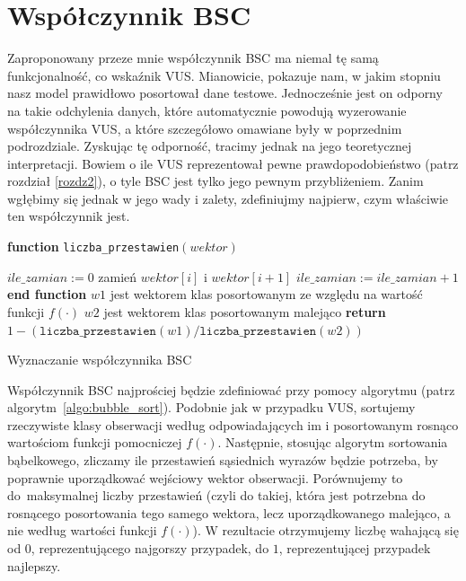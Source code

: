 \documentclass{mini}
\newlength\myindent
\newcommand\bindent{%
  \begingroup
  \setlength{\itemindent}{\myindent}
  \addtolength{\algorithmicindent}{\myindent}
}
\newcommand\eindent{\endgroup}
\begin{document}
\section{Współczynnik BSC}

Zaproponowany przeze mnie współczynnik BSC ma niemal tę samą funkcjonalność, co wskaźnik VUS. Mianowicie, pokazuje nam, w jakim stopniu nasz model prawidłowo posortował dane testowe. Jednocześnie jest on odporny na takie odchylenia danych, które automatycznie powodują wyzerowanie współczynnika VUS, a które szczegółowo omawiane były w poprzednim podrozdziale. Zyskując tę odporność, tracimy jednak na jego teoretycznej interpretacji. Bowiem o ile VUS reprezentował pewne prawdopodobieństwo (patrz rozdział \ref{rozdz2}), o tyle BSC jest tylko jego pewnym przybliżeniem. Zanim wgłębimy się jednak w jego wady i zalety, zdefiniujmy najpierw, czym właściwie ten współczynnik jest.  

\begin{algorithm}
\begin{algorithmic}
\STATE
\STATE \textbf{function} \texttt{liczba\_przestawien}$(wektor)$
\bindent
\STATE $ile\_zamian := 0$ 
            \STATE zamień $wektor[i]$ i $wektor[i+1]$
            \STATE $ile\_zamian := ile\_zamian+1$
        \ENDIF
    \ENDFOR
\ENDFOR
\eindent
\STATE \textbf{end function}
\STATE
\STATE $w1$ jest wektorem klas posortowanym ze względu na wartość funkcji $f(\cdot)$
\STATE $w2$ jest wektorem klas posortowanym malejąco
\STATE
\STATE \textbf{return} $1-(\texttt{liczba\_przestawien}(w1)/\texttt{liczba\_przestawien}(w2))$
\end{algorithmic}
\caption{Wyznaczanie współczynnika BSC}
\label{algo:bubble_sort}
\end{algorithm}

Współczynnik BSC najprościej będzie zdefiniować przy pomocy algorytmu (patrz algorytm~\ref{algo:bubble_sort}). Podobnie jak w przypadku VUS, sortujemy rzeczywiste klasy obserwacji według odpowiadających im i posortowanym rosnąco wartościom funkcji pomocniczej $f(\cdot)$. Następnie, stosując algorytm sortowania bąbelkowego, zliczamy ile przestawień sąsiednich wyrazów będzie potrzeba, by poprawnie uporządkować wejściowy wektor obserwacji. Porównujemy to do~maksymalnej liczby przestawień (czyli do takiej, która jest potrzebna do rosnącego posortowania tego samego wektora, lecz uporządkowanego malejąco, a nie według wartości funkcji $f(\cdot)$). W rezultacie otrzymujemy liczbę wahającą się od $0$, reprezentującego najgorszy przypadek, do $1$, reprezentującej przypadek najlepszy. 
\end{document}
